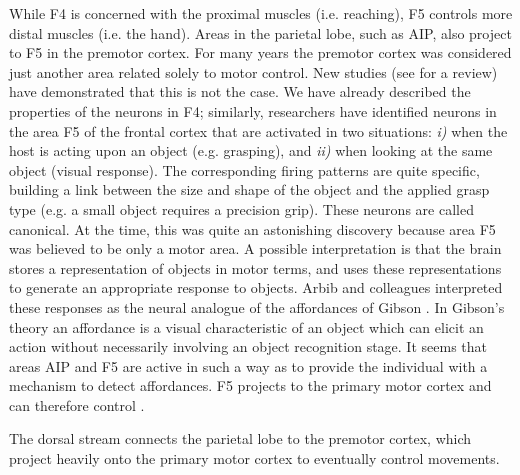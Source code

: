 While F4 is concerned with the proximal muscles (i.e. reaching), F5
controls more distal muscles (i.e. the hand). Areas in the parietal 
lobe, such as AIP, also project to F5 in the premotor cortex.
For many years the premotor cortex was considered
just another area related solely to motor control. New studies (see \cite{jeannerod97cognitive} for a review) 
have demonstrated that this is not the case. We have already described the
properties of the neurons in F4; similarly, researchers have 
identified neurons in the area F5 of the frontal cortex \cite{fadiga00visuomotor} 
that are activated in two situations: {\it i)} when the host is acting upon an object 
(e.g. grasping), and {\it ii)} when looking at the same object (visual response). 
The corresponding firing patterns are quite specific, building a link between the size 
and shape of the object and the applied grasp type (e.g. a small object 
requires a precision grip). These neurons are called canonical. At the time,
this was quite an astonishing discovery because area F5 was believed 
to be only a motor area. A possible interpretation is that the brain 
stores a representation of objects in motor terms, and uses these 
representations to generate an appropriate response to objects. 
Arbib and colleagues \cite{fagg-arbib-1998} interpreted
these responses as the neural analogue of the affordances of Gibson 
\cite{gibson77theory}. In Gibson's theory an affordance is a visual
characteristic of an object which can elicit an action without necessarily
involving an object recognition stage. It seems that areas AIP and F5 are 
active in such a way as to provide the individual with a mechanism to 
detect affordances. F5 projects to the primary motor cortex and can 
therefore control \ahhbehavior{}.

\ifverbose
The dorsal stream connects the parietal lobe to the premotor cortex,
which project heavily onto the primary motor cortex to eventually
control movements.
\fi


